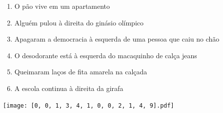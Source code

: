 \documentclass[12pt]{article}
\begin{document}
		 

\pagebreak


	\begin{enumerate}
		  \sffamily %
		  \large %


\vfill \item
O pão vive	%
em um apartamento	%

\vfill \item
Alguém pulou	%
à direita
do ginásio olímpico	%

\vfill \item
Apagaram a democracia	%
à esquerda
de uma pessoa que caiu no chão	%

\vfill \item
O desodorante está	%
à esquerda
do macaquinho de calça jeans	%

\vfill \item
Queimaram laços de fita amarela	%
na calçada	%

\vfill \item
A escola continua	%
à direita
da girafa	%
	\end{enumerate}
		  
		  \hfill

		  \vfill

\texttt{[image: [0, 0, 1, 3, 4, 1, 0, 0, 2, 1, 4, 9].pdf]}


	\hfill	  	  


\pagebreak			
\end{document}

